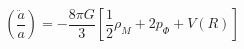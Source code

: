\begin{equation}
(\frac{\ddot{a}}{a})=-\frac{8\pi G}{3}[\frac{1}{2}\rho_{M}+2
p_{\Phi}+V(R)]
\end{equation}

